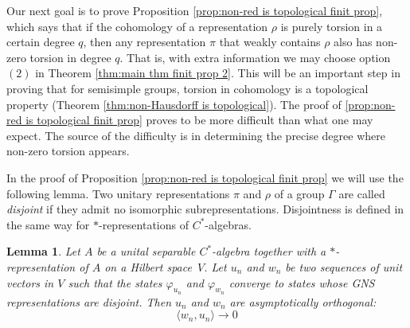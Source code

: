 \documentclass[12pt,reqno]{amsart}
\newtheorem{lemma}[theorem]{Lemma}
\theoremstyle{definition}
\begin{document}
Our next goal is to prove Proposition \ref{prop:non-red is topological finit prop}, which says that if the cohomology of a representation $\rho$ is purely torsion in a certain degree $q$, then any representation $\pi$ that weakly contains $\rho$ also has non-zero torsion in degree $q$. That is, with extra information we may choose option $(2)$ in Theorem \ref{thm:main thm finit prop 2}. This will be an important step in proving that for semisimple groups, torsion in cohomology is a topological property (Theorem \ref{thm:non-Hausdorff is topological}). The proof of \ref{prop:non-red is topological finit prop} proves to be more difficult than what one may expect. The source of the difficulty is in determining the precise degree where non-zero torsion appears.

In the proof of Proposition \ref{prop:non-red is topological finit prop} we will use the following lemma. Two unitary representations $\pi$ and $\rho$ of a group $\Gamma$ are called \emph{disjoint} if they admit no isomorphic subrepresentations. Disjointness is defined in the same way for $*$-representations of $C^*$-algebras.
\begin{lemma}\label{assympot ortho of states}
    Let $A$ be a unital separable $C^*$-algebra together with a $*$-representation of $A$ on a Hilbert space~$V$. Let $u_n$ and $w_n$ be two sequences of unit vectors in $V$ such that the states $\varphi_{u_n}$ and $\varphi_{w_n}$ converge to states whose GNS representations are disjoint. Then $u_n$ and $w_n$ are asymptotically orthogonal:
    $$\langle w_n, u_n \rangle \rightarrow 0$$
\end{lemma}
\end{document}
